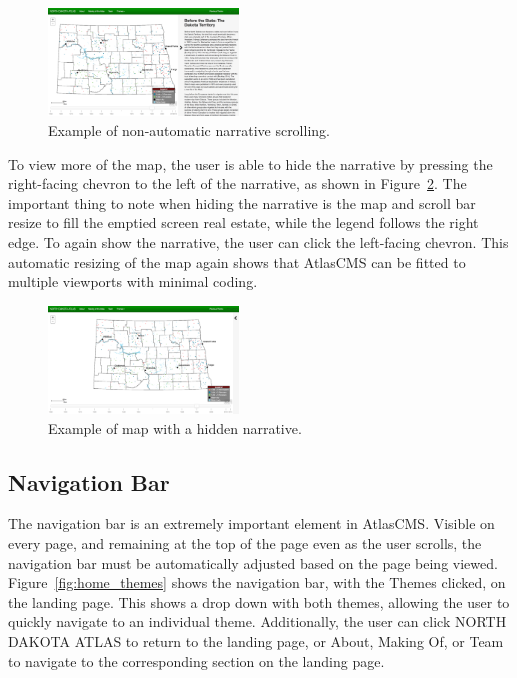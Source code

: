 \documentclass[11pt, final, conference, twocolumn]{IEEEtran}
\begin{document}
\begin{figure}[h!]
	\centering
	\includegraphics[width=0.45\textwidth]{ancestry_jump}
	\caption{Example of non-automatic narrative scrolling.}
	\label{fig:ancestry_jump}
\end{figure}

To view more of the map, the user is able to hide the narrative by pressing the right-facing chevron to the left of the narrative, as shown in Figure~\ref{fig:ancestry_no_narrative}. The important thing to note when hiding the narrative is the map and scroll bar resize to fill the emptied screen real estate, while the legend follows the right edge. To again show the narrative, the user can click the left-facing chevron. This automatic resizing of the map again shows that AtlasCMS can be fitted to multiple viewports with minimal coding.

\begin{figure}[h!]
	\centering
	\includegraphics[width=0.45\textwidth]{ancestry_no_narrative}
	\caption{Example of map with a hidden narrative.}
	\label{fig:ancestry_no_narrative}
\end{figure}

\subsection{Navigation Bar}
The navigation bar is an extremely important element in AtlasCMS. Visible on every page, and remaining at the top of the page even as the user scrolls, the navigation bar must be automatically adjusted based on the page being viewed. Figure~\ref{fig:home_themes} shows the navigation bar, with the Themes clicked, on the landing page. This shows a drop down with both themes, allowing the user to quickly navigate to an individual theme. Additionally, the user can click NORTH DAKOTA ATLAS to return to the landing page, or About, Making Of, or Team to navigate to the corresponding section on the landing page.
\end{document}
